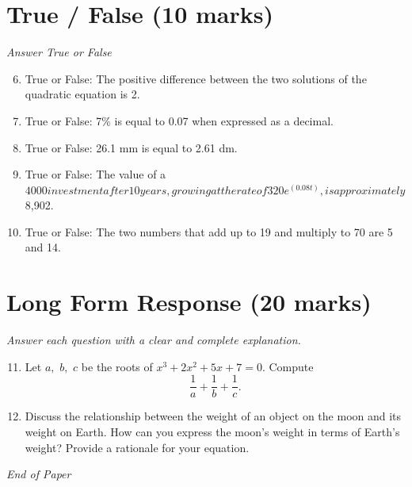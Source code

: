 \documentclass[12pt]{article}
\begin{document}
\section*{True / False (10 marks)}
\textit{Answer True or False}
\begin{enumerate}[label=\arabic*.]
\setcounter{enumi}{5}
\item True or False: The positive difference between the two solutions of the quadratic equation is 2.
\item True or False: 7\% is equal to 0.07 when expressed as a decimal.
\item True or False: 26.1 mm is equal to 2.61 dm.
\item True or False: The value of a $4000 investment after 10 years, growing at the rate of 320 e^(0.08 t), is approximately $8,902.
\item True or False: The two numbers that add up to 19 and multiply to 70 are 5 and 14.
\end{enumerate}

\section*{Long Form Response (20 marks)}
\textit{Answer each question with a clear and complete explanation.}
\begin{enumerate}[label=\arabic*.]
\setcounter{enumi}{10}
\item Let $a,$ $b,$ $c$ be the roots of $x^3 + 2 x^2 + 5 x + 7 = 0.$ Compute \[\frac{1}{a} + \frac{1}{b} + \frac{1}{c}.\]
\item Discuss the relationship between the weight of an object on the moon and its weight on Earth. How can you express the moon's weight in terms of Earth's weight? Provide a rationale for your equation.
\end{enumerate}

\vfill
\noindent\textit{End of Paper}
\end{document}
